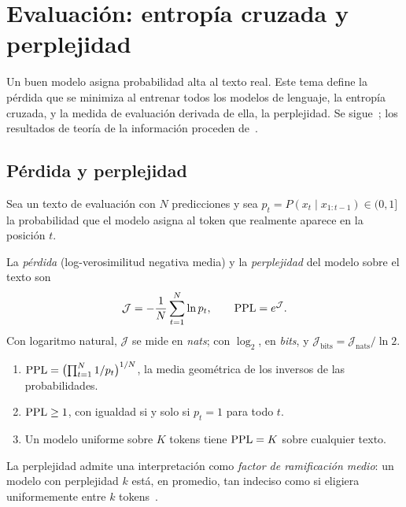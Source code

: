 \chapter{Evaluación: entropía cruzada y perplejidad}
\label{tema:5}

Un buen modelo asigna probabilidad alta al texto real. Este tema define la pérdida que se minimiza al entrenar todos los modelos de lenguaje, la entropía cruzada, y la medida de evaluación derivada de ella, la perplejidad. Se sigue~\cite[§3.2, §3.3 y §3.7]{jm3}; los resultados de teoría de la información proceden de~\cite[cap.~2]{ct}.

\section{Pérdida y perplejidad}

Sea un texto de evaluación con $N$ predicciones y sea $p_t=P(x_t\mid x_{1:t-1})\in(0,1]$ la probabilidad que el modelo asigna al token que realmente aparece en la posición $t$.

\begin{definicion}\label{def:ppl}
La \emph{pérdida} (log-verosimilitud negativa media) y la \emph{perplejidad} del modelo sobre el texto son
\[
\mathcal{J}=-\frac{1}{N}\sum_{t=1}^{N}\ln p_t,\qquad \operatorname{PPL}=e^{\mathcal{J}}.
\]
Con logaritmo natural, $\mathcal{J}$ se mide en \emph{nats}; con $\log_2$, en \emph{bits}, y $\mathcal{J}_{\text{bits}}=\mathcal{J}_{\text{nats}}/\ln 2$.
\end{definicion}

\begin{proposicion}\label{prop:ppl}
\begin{enumerate}
  \item $\operatorname{PPL}=\bigl(\prod_{t=1}^{N}1/p_t\bigr)^{1/N}$, la media geométrica de los inversos de las probabilidades.
  \item $\operatorname{PPL}\ge 1$, con igualdad si y solo si $p_t=1$ para todo $t$.
  \item Un modelo uniforme sobre $K$ tokens tiene $\operatorname{PPL}=K$ sobre cualquier texto.
\end{enumerate}
\end{proposicion}

La perplejidad admite una interpretación como \emph{factor de ramificación medio}: un modelo con perplejidad $k$ está, en promedio, tan indeciso como si eligiera uniformemente entre $k$ tokens~\cite[§3.3.1]{jm3}.

